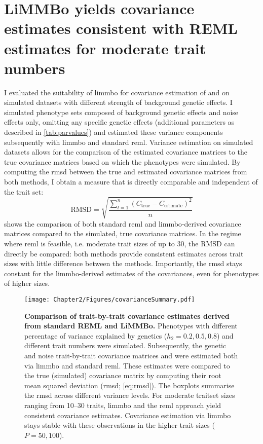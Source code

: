\section{LiMMBo yields covariance estimates consistent with REML estimates for moderate trait numbers}
\label{section:covariance-limmbo}
I evaluated the suitability of \gls{limmbo} for covariance estimation of  and  on simulated datasets with different strength of background genetic effects. I simulated phenotype sets composed of background genetic effects  and noise effects \tmat{\Psi} only, omitting any specific genetic effects (additional parameters as described in \cref{tab:parvalues}) and estimated these variance components subsequently with \gls{limmbo} and standard \gls{reml}. Variance estimation on simulated datasets allows for the comparison of the estimated covariance matrices to the true covariance matrices based on which the phenotypes were simulated. By computing the \gls{rmsd} between the true and estimated covariance matrices from both methods, I obtain a measure that is directly comparable and independent of the trait set: 
\begin{equation}
\text{RMSD}=\sqrt{\frac{\sum_{t=1}^n (C_{\text{true}} - C_{\text{estimate}})^2}{n}}
\label{eq:rmsd}
\end{equation}
 shows the comparison of both standard \gls{reml} and \gls{limmbo}-derived covariance matrices compared to the simulated, true covariance matrices. In the regime where \gls{reml} is feasible, i.e. moderate trait sizes of up to \num{30}, the RMSD can directly be compared: both methods provide consistent estimates across trait sizes with little difference between the methods. Importantly, the \gls{rmsd} stays constant for the \gls{limmbo}-derived estimates of the covariances, even for phenotypes of higher sizes. 

\begin{figure}[h]
	\centering	
	\texttt{[image: Chapter2/Figures/covarianceSummary.pdf]}\\
	\caption[\textbf{Comparison of trait-by-trait covariance estimates derived from standard REML and LiMMBo.}]{\textbf{Comparison of trait-by-trait covariance estimates derived from standard REML and LiMMBo.} Phenotypes with different percentage of variance explained by genetics (\(h_2={0.2, 0.5, 0.8}\)) and different trait numbers were simulated. Subsequently, the genetic and noise trait-by-trait covariance matrices  and  were estimated both via \gls{limmbo} and standard \gls{reml}. These estimates were compared to the true (simulated) covariance matrix by computing their root mean squared deviation (\gls{rmsd}; \cref{eq:rmsd}). The boxplots summarise the \gls{rmsd} across different variance levels. For moderate traitset sizes ranging from \numrange{10}{30} traits, \gls{limmbo} and the \gls{reml} approach yield consistent covariance estimates. Covariance estimation via \gls{limmbo} stays stable with these observations in the higher trait sizes (\(P={50,100}\)). }
	  \label{fig:covsimilarity}%
\end{figure}


